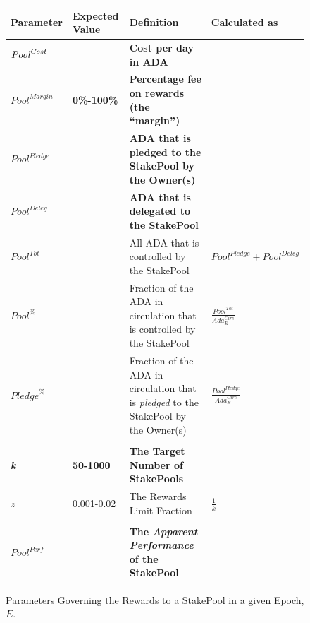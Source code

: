 \documentclass[11pt,a4paper,dvipsnames,twosided,final]{article}
\newcommand{\ada}{ADA{}}
\begin{document}
\begin{figure}[h!]
\begin{center}
\begin{tabular}{||l|l|p{6cm}|l||}
  \hline \hline
\textbf{Parameter} & \textbf{Expected Value} & \textbf{Definition} & \textbf{Calculated as} \\\hline
\textbf{\color{red} $\textit{\textit{Pool}}^{\textit{Cost}}$} &  & \textbf{\color{red} Cost per day in \ada{}} & \\\hline
\textbf{\color{red} ${\textit{Pool}}^{\textit{Margin}}$} &  \textbf{\color{red} 0\%-100\%} & \textbf{\color{red} Percentage fee on rewards (the ``margin'')} & \\\hline
\textbf{\color{red} ${Pool}^\textit{Pledge}$} & & \textbf{\color{red} \ada{} that is pledged to the StakePool by the Owner(s)} & \\\hline
\textbf{\color{blue} ${\textit{Pool}}^\textit{Deleg}$} & & \textbf{\color{blue} \ada{} that is delegated to the StakePool} & \\\hline
${\textit{Pool}}^{Tot}$ & & All \ada{} that is controlled by the StakePool & ${\textit{Pool}}^\textit{Pledge} + {\textit{Pool}}^\textit{Deleg}$ \\\hline
${\textit{Pool}}^\%$ & & Fraction of the \ada{} in circulation that is controlled by the StakePool & {\large $\frac{{\textit{Pool}}^{Tot}}{\textit{Ada}^{\textit{Circ}}_E}$} \\\hline
${\textit{Pledge}}^\%$ & & Fraction of the \ada{} in circulation that is \emph{pledged} to the StakePool by the Owner(s) & {\large $\frac{{\textit{Pool}}^{Pledge}}{\textit{Ada}^{\textit{Circ}}_E}$} \\\hline
&&&  \\\hline
\textbf{\color{green} \emph{k}} & \textbf{\color{green} 50-1000} & \textbf{\color{green} The Target Number of StakePools} & \\\hline
\emph{z} & 0.001-0.02 & The Rewards Limit Fraction & $\frac{1}{k}$ \\\hline
&&&  \\\hline
\textbf{\color{cyan} $\textit{Pool}^{\textit{Perf}}$} & & \textbf{\color{cyan} The \emph{Apparent Performance} of the StakePool} & \\\hline
  \hline
\end{tabular}
\end{center}
\caption{Parameters Governing the Rewards to a StakePool in a given Epoch, $E$.}
\label{fig:rewards-MainNet}
\end{figure}
\end{document}
